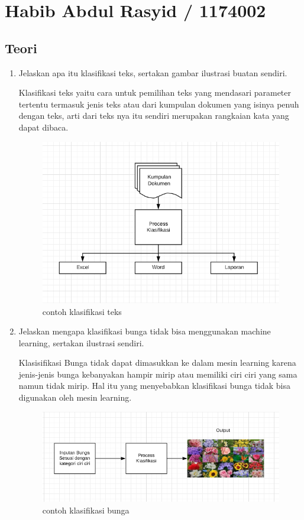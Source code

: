 \section{Habib Abdul Rasyid / 1174002}

\subsection{Teori}
\begin{enumerate}
\item Jelaskan apa itu klasifikasi teks, sertakan gambar ilustrasi buatan sendiri.\par
Klasifikasi teks yaitu cara untuk pemilihan teks yang mendasari parameter tertentu termasuk jenis teks atau dari kumpulan dokumen yang isinya penuh dengan teks, arti dari teks nya itu sendiri merupakan rangkaian kata yang dapat dibaca.

\begin{figure}[ht]
\centering
\includegraphics[scale=0.2]{figures/1174002/4/1.PNG}
\caption{contoh klasifikasi teks}
\label{contoh}
\end{figure}

\item Jelaskan mengapa klasifikasi bunga tidak bisa menggunakan machine learning, sertakan ilustrasi sendiri.\par
Klasisifikasi Bunga tidak dapat dimasukkan ke dalam mesin learning karena jenis-jenis bunga kebanyakan hampir mirip atau memiliki ciri ciri yang sama namun tidak mirip. Hal itu yang menyebabkan klasifikasi bunga tidak bisa digunakan oleh mesin learning.

\begin{figure}[ht]
\centering
\includegraphics[scale=0.2]{figures/1174002/4/2.PNG}
\caption{contoh klasifikasi bunga}
\label{contoh}
\end{figure}


\end{enumerate}
